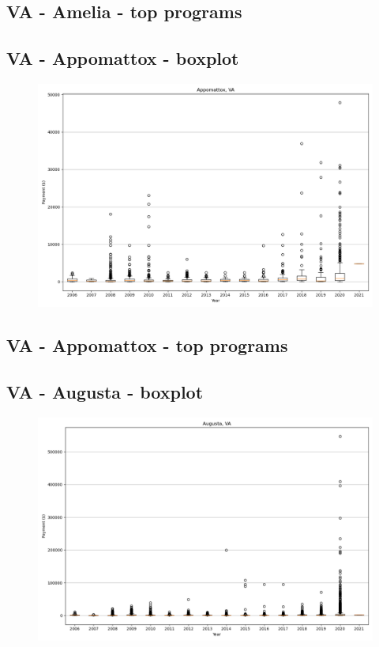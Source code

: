 \subsection*{VA - Amelia - top programs}

\newpage
\subsection*{VA - Appomattox - boxplot}
\begin{figure}[h]
\centering
\includegraphics[width=7in]{../output/boxplots/counties/Appomattox-VA_boxplot.png}
\end{figure}


\subsection*{VA - Appomattox - top programs}

\newpage
\subsection*{VA - Augusta - boxplot}
\begin{figure}[h]
\centering
\includegraphics[width=7in]{../output/boxplots/counties/Augusta-VA_boxplot.png}
\end{figure}


